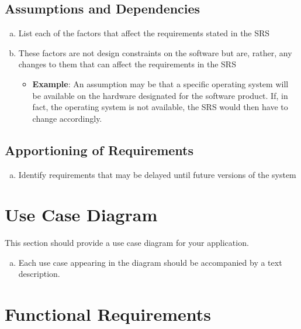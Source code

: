 \documentclass[]{article}
\begin{document}
\subsection{Assumptions and Dependencies}
\label{sub:assumptions_and_dependencies}
\begin{enumerate}[a)]
	\item List each of the factors that affect the requirements stated in the SRS
	\item These factors are not design constraints on the software but are, rather, any changes to them that can affect the requirements in the SRS
	\begin{itemize}
		\item \textbf{Example}: An assumption may be that a specific operating system will be available on the hardware designated for the software product. If, in fact, the operating system is not available, the SRS would then have to change accordingly.
	\end{itemize}
\end{enumerate}

\subsection{Apportioning of Requirements}
\label{sub:apportioning_of_requirements}
\begin{enumerate}[a)]
	\item Identify requirements that may be delayed until future versions of the system
\end{enumerate}


\section{Use Case Diagram}
\label{sec:use_case_diagram}
This section should provide a use case diagram for your application. 
\begin{enumerate}[a)]
	\item Each use case appearing in the diagram should be accompanied by a text description. 
\end{enumerate}

\section{Functional Requirements}
\label{sec:functional_requirements}
\end{document}

